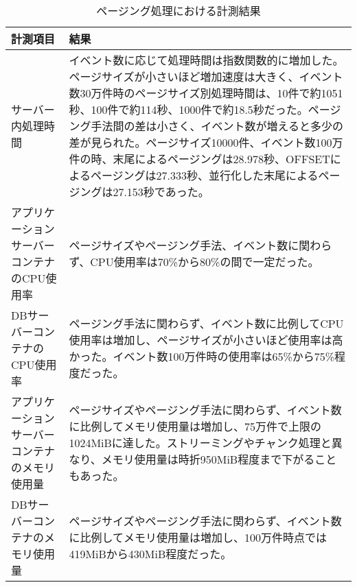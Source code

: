 \documentclass[../../../main]{subfiles}
\begin{document}
    \begin{table}[H]
        \centering
        \caption{ページング処理における計測結果}
        \label{tab:result-paging}
        \begin{tabular}{|p{4cm}|p{10cm}|}
            \hline
            \textbf{計測項目}                & \textbf{結果}                                                                                                                                                                                                                                     \\ \hline
            サーバー内処理時間                    & イベント数に応じて処理時間は指数関数的に増加した。ページサイズが小さいほど増加速度は大きく、イベント数30万件時のページサイズ別処理時間は、10件で約1051秒、100件で約114秒、1000件で約18.5秒だった。ページング手法間の差は小さく、イベント数が増えると多少の差が見られた。ページサイズ10000件、イベント数100万件の時、末尾によるページングは28.978秒、OFFSETによるページングは27.333秒、並行化した末尾によるページングは27.153秒であった。 \\ \hline
            アプリケーションサーバーコンテナのCPU使用率      & ページサイズやページング手法、イベント数に関わらず、CPU使用率は70\%から80\%の間で一定だった。                                                                                                                                                                                            \\ \hline
            DBサーバーコンテナのCPU使用率            & ページング手法に関わらず、イベント数に比例してCPU使用率は増加し、ページサイズが小さいほど使用率は高かった。イベント数100万件時の使用率は65\%から75\%程度だった。                                                                                                                                                         \\ \hline
            アプリケーションサーバーコンテナのメモリ使用量      & ページサイズやページング手法に関わらず、イベント数に比例してメモリ使用量は増加し、75万件で上限の1024MiBに達した。ストリーミングやチャンク処理と異なり、メモリ使用量は時折950MiB程度まで下がることもあった。                                                                                                                                   \\ \hline
            DBサーバーコンテナのメモリ使用量            & ページサイズやページング手法に関わらず、イベント数に比例してメモリ使用量は増加し、100万件時点では419MiBから430MiB程度だった。                                                                                                                                                                          \\ \hline

\end{tabular}
\end{table}
\end{document}
